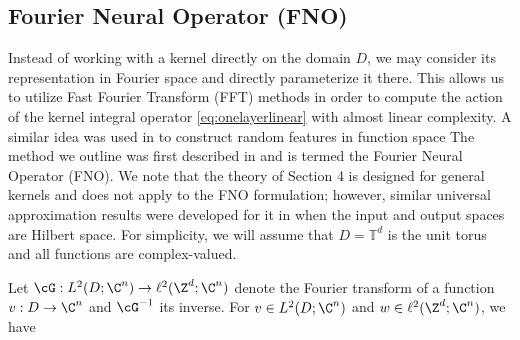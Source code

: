 



\subsection{Fourier Neural Operator (FNO)}
\label{sec:fourier}
Instead of working with a kernel directly on the domain \(D\), we may consider its representation in Fourier space and directly parameterize it there. This allows us to utilize Fast Fourier Transform (FFT) methods in order to compute the action of the kernel integral operator  \eqref{eq:onelayerlinear} with almost linear complexity. A similar idea was used in \citep{nelsen2020random} to construct random features in function space The method we outline was first described in \cite{li2020fourier} and is termed the Fourier Neural Operator (FNO). We note that the theory of Section 4 is designed for general kernels and does not apply to the FNO formulation; however, similar universal approximation results were developed for it in \citep{kovachki2021universal} when the input and output spaces are Hilbert space.
For simplicity, we will assume that \(D = \mathbb{T}^d\) is the unit torus and all functions are complex-valued.
\iffalse
Let \(\cG : L^2(D;\C^n) \to L^2(D;\C^n)\) denote the Fourier transform of a function $v: D \to \C^n$ and $\cG^{-1}$ its inverse. If \(v \in L^1(D;\C^n)\) then the Fourier transform is defined as  
\begin{align*}
    &(\cG v)_j(k) = \int_{D} v_j(x) e^{- 2i \pi \langle x, k \rangle} \mathrm{d}x\\
    &(\cG^{-1} v)_j(x) = \int_{D} v_j(k) e^{2i \pi \langle x, k \rangle} \mathrm{d}k
\end{align*}
for $j=1,\dots,n$ where \(i = \sqrt{-1}\) is the imaginary unit and \(\langle \cdot, \cdot \rangle\) denotes the Euclidean inner product on \(\R^d\). The defintion for \(L^2\) follows by a limiting procedure. 
\fi
Let \(\cG : L^2(D;\C^n) \to \ell^2(\Z^d;\C^n)\) denote the Fourier transform of a function $v: D \to \C^n$ and $\cG^{-1}$ its inverse. For \(v \in L^2(D;\C^n)\) and \(w \in \ell^2(\Z^d;\C^n)\), we have 
